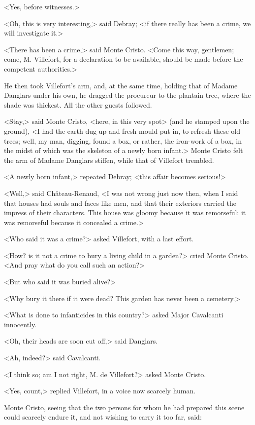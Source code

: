  <Yes, before witnesses.> 

 <Oh, this is very interesting,> said Debray; <if there really has been a crime, we will investigate it.> 

 <There has been a crime,> said Monte Cristo. <Come this way, gentlemen; come, M. Villefort, for a declaration to be available, should be made before the competent authorities.> 

 He then took Villefort's arm, and, at the same time, holding that of Madame Danglars under his own, he dragged the procureur to the plantain-tree, where the shade was thickest. All the other guests followed. 

 <Stay,> said Monte Cristo, <here, in this very spot> (and he stamped upon the ground), <I had the earth dug up and fresh mould put in, to refresh these old trees; well, my man, digging, found a box, or rather, the iron-work of a box, in the midst of which was the skeleton of a newly born infant.>  Monte Cristo felt the arm of Madame Danglars stiffen, while that of Villefort trembled. 

 <A newly born infant,> repeated Debray; <this affair becomes serious!> 

 <Well,> said Château-Renaud, <I was not wrong just now then, when I said that houses had souls and faces like men, and that their exteriors carried the impress of their characters. This house was gloomy because it was remorseful: it was remorseful because it concealed a crime.> 

 <Who said it was a crime?> asked Villefort, with a last effort. 

 <How? is it not a crime to bury a living child in a garden?> cried Monte Cristo. <And pray what do you call such an action?> 

 <But who said it was buried alive?> 

 <Why bury it there if it were dead? This garden has never been a cemetery.> 

 <What is done to infanticides in this country?> asked Major Cavalcanti innocently. 

 <Oh, their heads are soon cut off,> said Danglars. 

 <Ah, indeed?> said Cavalcanti. 

 <I think so; am I not right, M. de Villefort?> asked Monte Cristo. 

 <Yes, count,> replied Villefort, in a voice now scarcely human. 

 Monte Cristo, seeing that the two persons for whom he had prepared this scene could scarcely endure it, and not wishing to carry it too far, said: 

